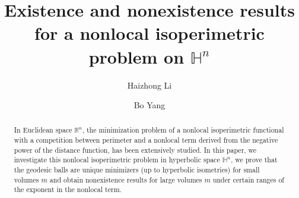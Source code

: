\documentclass[11pt,reqno]{amsart}
\theoremstyle{definition}
\theoremstyle{remark}
\numberwithin{equation}{section}
\renewcommand{\(}{\left(}
\renewcommand{\)}{\right)}
\renewcommand{\-}{\overline}
\begin{document}
	\title[A nonlocal isoperimetric problem on $\mathbb{H}^n$]{Existence and nonexistence results for a nonlocal isoperimetric problem on $\mathbb{H}^n$}	
\author[H. Li]{Haizhong Li}
\address{Department of Mathematical Sciences, Tsinghua University, Beijing 100084, P.R. China}
\author[B. Yang]{Bo Yang}
\address{Department of Mathematical Sciences, Tsinghua University, Beijing 100084, P.R. China}
\address{Institut f\"{u}r Diskrete Mathematik und Geometrie, Technische Universit\"{a}t Wien, Wiedner Hauptstra{\ss}e 8-10, 1040 Wien, Austria}
	

	\begin{abstract}
		In Euclidean space $\mathbb{R}^n$, the minimization problem of a nonlocal isoperimetric functional with a competition between perimeter and a nonlocal term derived from the negative power of the distance function, has been extensively studied. In this paper, we investigate this nonlocal isoperimetric problem in hyperbolic space $\mathbb{H}^n$, we prove that the geodesic balls are unique minimizers (up to hyperbolic isometries) for small volumes $m$ and obtain nonexistence results for large volumes $m$ under certain ranges of the exponent in the nonlocal term.
	\end{abstract}	
	\maketitle
		\tableofcontents
\end{document}
